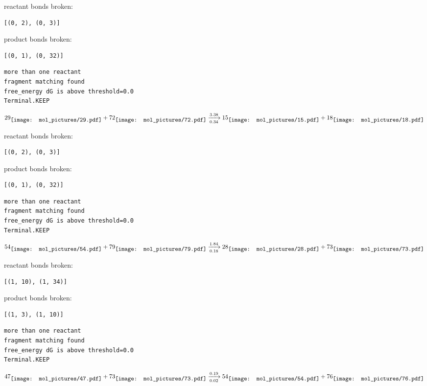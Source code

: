 \documentclass{article}
\begin{document}
reactant bonds broken:\begin{verbatim}
[(0, 2), (0, 3)]
\end{verbatim}
product bonds broken:\begin{verbatim}
[(0, 1), (0, 32)]
\end{verbatim}




\vspace{1cm}
\begin{verbatim}
more than one reactant
fragment matching found
free_energy dG is above threshold=0.0
Terminal.KEEP
\end{verbatim}
$$
29
\raisebox{-.5\height}{\texttt{[image: mol\_pictures/29.pdf]}}
+
72
\raisebox{-.5\height}{\texttt{[image: mol\_pictures/72.pdf]}}
\xrightarrow[0.34]{3.38}
15
\raisebox{-.5\height}{\texttt{[image: mol\_pictures/15.pdf]}}
+
18
\raisebox{-.5\height}{\texttt{[image: mol\_pictures/18.pdf]}}
$$


reactant bonds broken:\begin{verbatim}
[(0, 2), (0, 3)]
\end{verbatim}
product bonds broken:\begin{verbatim}
[(0, 1), (0, 32)]
\end{verbatim}




\vspace{1cm}
\begin{verbatim}
more than one reactant
fragment matching found
free_energy dG is above threshold=0.0
Terminal.KEEP
\end{verbatim}
$$
54
\raisebox{-.5\height}{\texttt{[image: mol\_pictures/54.pdf]}}
+
79
\raisebox{-.5\height}{\texttt{[image: mol\_pictures/79.pdf]}}
\xrightarrow[0.18]{1.84}
28
\raisebox{-.5\height}{\texttt{[image: mol\_pictures/28.pdf]}}
+
73
\raisebox{-.5\height}{\texttt{[image: mol\_pictures/73.pdf]}}
$$


reactant bonds broken:\begin{verbatim}
[(1, 10), (1, 34)]
\end{verbatim}
product bonds broken:\begin{verbatim}
[(1, 3), (1, 10)]
\end{verbatim}




\vspace{1cm}
\begin{verbatim}
more than one reactant
fragment matching found
free_energy dG is above threshold=0.0
Terminal.KEEP
\end{verbatim}
$$
47
\raisebox{-.5\height}{\texttt{[image: mol\_pictures/47.pdf]}}
+
73
\raisebox{-.5\height}{\texttt{[image: mol\_pictures/73.pdf]}}
\xrightarrow[0.02]{0.19}
54
\raisebox{-.5\height}{\texttt{[image: mol\_pictures/54.pdf]}}
+
76
\raisebox{-.5\height}{\texttt{[image: mol\_pictures/76.pdf]}}
$$
\end{document}
